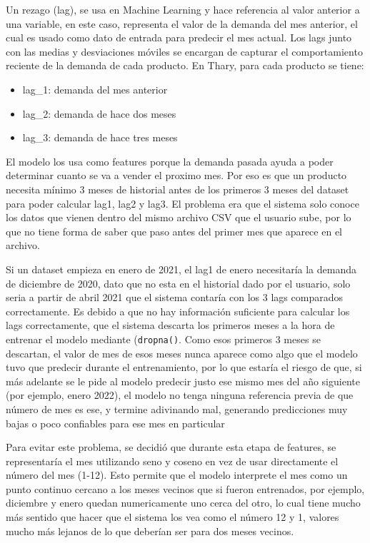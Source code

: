 Un rezago (lag), se usa en Machine Learning y hace referencia al valor anterior a una variable, en este caso, representa el valor de la demanda del mes anterior, el cual es usado como dato de entrada para predecir el mes actual. Los lags junto con las medias y desviaciones móviles se encargan de capturar el comportamiento reciente de la demanda de cada producto. En Thary, para cada producto se tiene:

\begin{itemize}
    \item lag\_1: demanda del mes anterior
    \item lag\_2: demanda de hace dos meses
    \item lag\_3: demanda de hace tres meses
\end{itemize}

El modelo los usa como features porque la demanda pasada ayuda a poder determinar cuanto se va a vender el proximo mes. Por eso es que un producto necesita mínimo 3 meses de historial antes de los primeros 3 meses del dataset para poder calcular lag1, lag2 y lag3. El problema era que el sistema solo conoce los datos que vienen dentro del mismo archivo CSV que el usuario sube, por lo que no tiene forma de saber que paso antes del primer mes que aparece en el archivo.

Si un dataset empieza en enero de 2021, el lag1 de enero necesitaría la demanda de diciembre de 2020, dato que no esta en el historial dado por el usuario, solo seria a partir de abril 2021 que el sistema contaría con los 3 lags comparados correctamente. Es debido a que no hay información suficiente para calcular los lags correctamente, que el sistema descarta los primeros meses a la hora de entrenar el modelo mediante (\texttt{dropna()}. Como esos primeros 3 meses se descartan,  el valor de mes de esos meses nunca aparece como algo que el modelo tuvo que predecir durante el entrenamiento, por lo que estaría el riesgo de que, si más adelante se le pide al modelo predecir justo ese mismo mes del año siguiente (por ejemplo, enero 2022), el modelo no tenga ninguna referencia previa de que número de mes es ese, y termine adivinando mal, generando predicciones muy bajas o poco confiables para ese mes en particular

Para evitar este problema, se decidió que durante esta etapa de features, se representaría el mes utilizando seno y coseno en vez de usar directamente el número del mes (1-12). Esto permite que el modelo interprete el mes como un punto continuo cercano a los meses vecinos que si fueron entrenados, por ejemplo, diciembre y enero quedan numericamente uno cerca del otro, lo cual tiene mucho más sentido que hacer que el sistema los vea como el número 12 y 1, valores mucho más lejanos de lo que deberían ser para dos meses vecinos. 

